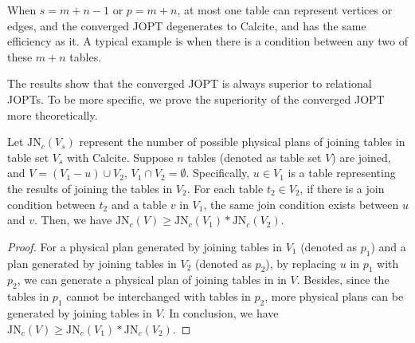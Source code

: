 When $s = m + n - 1$ or $p = m + n$, at most one table can represent vertices or edges, and the converged JOPT degenerates to Calcite, and has the same efficiency as it.
A typical example is when there is a condition between any two of these $m + n$ tables.

The results show that the converged JOPT is always superior to relational JOPTs.
To be more specific, we prove the superiority of the converged JOPT more theoretically.
\fi

\begin{lemma}
    \label{lemma:join-spliter}
    Let $\text{JN}_c(V_s)$ represent the number of possible physical plans of joining tables in table set $V_s$ with Calcite.
    Suppose $n$ tables (denoted as table set $V$) are joined, and $V = (V_1 - u) \cup V_2$, $V_1 \cap V_2 = \emptyset$.
    Specifically, $u \in V_1$ is a table representing the results of joining the tables in $V_2$.
    For each table $t_2 \in V_2$, if there is a join condition between $t_2$ and a table $v$ in $V_1$, the same join condition exists between $u$ and $v$.
    Then, we have $\text{JN}_c(V) \geq \text{JN}_c(V_1) * \text{JN}_c(V_2)$.
\end{lemma}
\begin{proof}
    For a physical plan generated by joining tables in $V_1$ (denoted as $p_1$) and a plan generated by joining tables in $V_2$ (denoted as $p_2$), by replacing $u$ in $p_1$ with $p_2$, we can generate a physical plan of joining tables in in $V$.
    Besides, since the tables in $p_1$ cannot be interchanged with tables in $p_2$, more physical plans can be generated by joining tables in $V$.
    In conclusion, we have $\text{JN}_c(V) \geq \text{JN}_c(V_1) * \text{JN}_c(V_2)$.
\end{proof}

